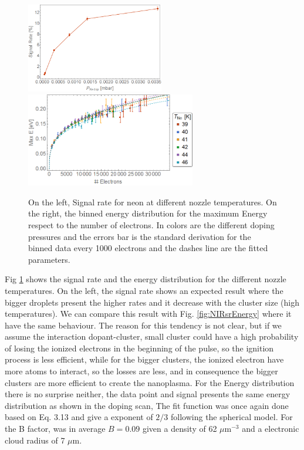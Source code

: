 \begin{figure}[htb]
\centering

\hspace*{\fill}
{ \includegraphics[width=6cm]{../Images/results/MIR_Ne_DropletSize/SigRate.png}} \hfill {\includegraphics[width=7.4cm]{../Images/results/MIR_Ne_DropletSize/binned.png}}
\hspace*{\fill}
\caption[MIR Ne-Xe cluster Size scan. Signal rate and Energy distribution]{On the left, Signal rate for neon at different nozzle temperatures. On the right, the binned energy distribution for the maximum Energy respect to the number of electrons. In colors are the different doping pressures and the errors bar is the standard derivation for the binned data every 1000 electrons and the dashes line are the fitted parameters.}
\label{fig:NeonsigrateDropltesize}
\end{figure}

Fig \ref{fig:NeonsigrateDropltesize} shows the signal rate and the energy distribution for the different nozzle temperatures. On the left, the signal rate shows an expected result where the bigger droplets present the higher rates and it decrease with the cluster size (high temperatures). We can compare this result with Fig. \ref{fig:NIRsrEnergy} where it have the same behaviour. The reason for this tendency is not clear, but if we assume the interaction dopant-cluster, small cluster could have a high probability of losing the ionized electrons in the beginning of the pulse, so the ignition process is less efficient, while for the bigger clusters, the ionized electron have more atoms to interact, so the losses are less, and in consequence the bigger clusters are more efficient to create the nanoplasma. For the Energy distribution there is no surprise neither, the data point and signal presents the same energy distribution as shown in the doping scan, The fit function was once again done based on Eq. 3.13 and give a exponent of $2/3$ following the spherical model. For the B factor, was in average $B=0.09$ given a density of 62 $\mu$m$^{-3}$ and a electronic cloud radius of 7 $\mu$m.

